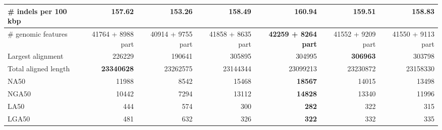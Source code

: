 \documentclass[12pt,a4paper]{article}
\begin{document}
\begin{table}[ht]
\begin{center}
\begin{tabular}{|l*{6}{|r}|}
\# indels per 100 kbp & 157.62 & {\bf 153.26} & 158.49 & 160.94 & 159.51 & 158.83 \\ \hline
\# genomic features & 41764 + 8988 part & 40914 + 9755 part & 41858 + 8635 part & {\bf 42259 + 8264 part} & 41552 + 9209 part & 41550 + 9113 part \\ \hline
Largest alignment & 226229 & 190641 & 305895 & 304995 & {\bf 306963} & 303798 \\ \hline
Total aligned length & {\bf 23340628} & 23262575 & 23144344 & 23099213 & 23230872 & 23158330 \\ \hline
NA50 & 11988 & 8542 & 15468 & {\bf 18567} & 14015 & 13498 \\ \hline
NGA50 & 10442 & 7294 & 13112 & {\bf 14828} & 13340 & 11996 \\ \hline
LA50 & 444 & 574 & 300 & {\bf 282} & 322 & 315 \\ \hline
LGA50 & 481 & 632 & 326 & {\bf 322} & 332 & 335 \\ \hline
\end{tabular}
\end{center}
\end{table}
\end{document}
